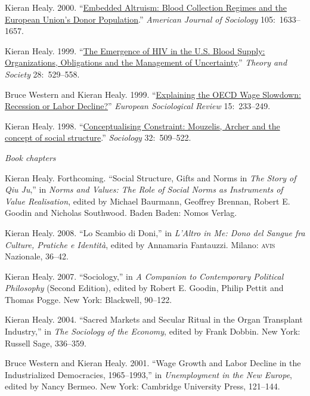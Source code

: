 \documentclass[11pt,article,oneside]{memoir}
\begin{document}
\ind Kieran Healy. 2000. ``\href{http://www.kieranhealy.org/files/papers/embed-alt.pdf}{Embedded Altruism: Blood Collection Regimes and the European
  Union's Donor Population}.'' \emph{American Journal of Sociology} 105:~1633--1657.


\ind Kieran Healy. 1999.  ``\href{http://www.kieranhealy.org/files/papers/ts.pdf}{The Emergence of HIV in the U.S. Blood Supply: Organizations,
  Obligations and the Management of Uncertainty}.'' \emph{Theory and Society} 28:~529--558.


\ind Bruce Western and Kieran Healy. 1999. ``\href{http://www.kieranhealy.org/files/papers/western-healy99.pdf}{Explaining the OECD Wage Slowdown:
Recession or Labor Decline?}''  \emph{European Sociological Review}
15:~233--249.


\ind  Kieran Healy. 1998.  ``\href{http://www.kieranhealy.org/files/papers/constraint98.pdf}{Conceptualising Constraint: Mouzelis, Archer and the concept of
  social structure}.'' \emph{Sociology} 32:~509--522. 

\bigskip

\noindent\emph{Book chapters \vspace{0.05in}}

\ind Kieran Healy. Forthcoming. ``Social Structure, Gifts and Norms in \emph{The Story of Qiu Ju},'' in \emph{Norms and Values: The Role of Social Norms as Instruments of Value Realisation}, edited by Michael Baurmann, Geoffrey Brennan, Robert E. Goodin and Nicholas Southwood. Baden Baden: Nomos Verlag.

\ind Kieran Healy. 2008. ``Lo Scambio di Doni,'' in \emph{L'Altro in Me: Dono del Sangue fra Culture, Pratiche e Identità}, edited by Annamaria Fantauzzi. Milano: \textsc{avis} Nazionale, 36--42. 

\ind Kieran Healy. 2007. ``Sociology,'' in \emph{A Companion to Contemporary Political Philosophy} (Second Edition), edited by Robert E. Goodin, Philip Pettit and Thomas Pogge. New York: Blackwell, 90--122. 

\ind  Kieran Healy. 2004. ``Sacred Markets and Secular Ritual in the Organ Transplant
Industry,'' in \emph{The Sociology of the Economy}, edited by Frank Dobbin. New
York: Russell Sage, 336--359.

\ind Bruce Western and Kieran Healy.  2001.  ``Wage Growth and Labor Decline in the
Industrialized Democracies, 1965--1993,'' in \emph{Unemployment in the New
  Europe}, edited by Nancy Bermeo. New York: Cambridge University Press,
121--144.
\end{document}
